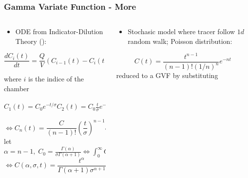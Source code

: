 %
% 

\begin{frame}
  \frametitle{Gamma Variate Function - More}

    \begin{columns}
    \begin{column}{0.45\textwidth}                 %
    {\footnotesize
    \cite{davenportDerivationGammaVariateRelationship1983}

    \begin{itemize}
        \item ODE from Indicator-Dilution Theory \newline (\cite{zierlerTheoreticalBasisIndicatorDilution1962}):
    \end{itemize}
    \begin{equation}
    \frac{dC_{i}(t)}{dt} = \frac{Q}{V} (C_{i-1}(t) - C_{i}(t))
    \end{equation}
    {\tiny
    where $i$ is the indice of the chamber
    
    \(
    C_{1}(t) = C_{0}e^{-t/\sigma} 

    C_{2}(t) = C_{0}\frac{t}{\sigma}e^{-t/\sigma} 

    C_{3}(t) = \frac{C_{0}}{2}(\frac{t}{\sigma})^{2}e^{-t/\sigma}
    \)}
    \vspace{-8pt}
    \begin{equation}
    \Leftrightarrow C_{n}(t) = \frac{C}{(n-1)!}(\frac{t}{\sigma})^{n-1}e^{-t/\sigma}
    \end{equation}
    {\tiny
    let $\alpha = n - 1, \; C_0 = \frac{\Gamma(\alpha)}{\sigma\Gamma(\alpha+1)} \Leftrightarrow \int^{\infty}_{0}C(t)dt = 0 $
    }
    \vspace{-8pt}
    \begin{equation}
    \Leftrightarrow C(\alpha, \sigma, t) = \frac{t^\alpha}{\Gamma(\alpha+1)\sigma^{\alpha+1}}e^{-t/\sigma}
    \end{equation}

    
    }
    \end{column}
    
    \hspace*{4em}                                                          %
    
    \begin{column}{0.5\textwidth}                                %
    {\tiny
    \begin{block}{\textwidth}
        \tiny
        \cite{sheppardMathematicalConsiderationsIndicator1954}
        \begin{itemize}
            \item Stochasic model where tracer follow $1d$ random walk; Poisson distribution:
        \end{itemize}
        \begin{equation}
            C(t) = \frac{t^{n-1}}{(n-1)!(1/n)^{n}}e^{-nt}
        \end{equation}
        reduced to a GVF by substituting
    

\end{block}}
\end{column}
\end{columns}
\end{frame}
